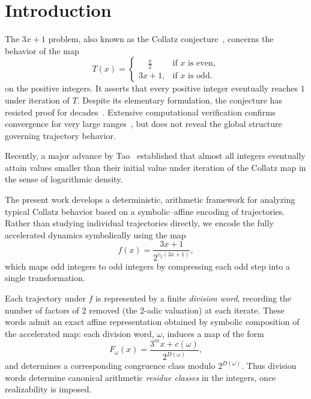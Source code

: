 \documentclass[12pt, oneside]{article}
\numberwithin{equation}{section}
\theoremstyle{definition}
\theoremstyle{plain}
\theoremstyle{remark}
\begin{document}
\newpage
\tableofcontents

\newpage
\section{Introduction}

The $3x+1$ problem, also known as the Collatz conjecture~\cite{Collatz1937}, concerns
the behavior of the map
\[
T(x) =
\begin{cases}
\displaystyle
    \phantom{3x} \frac{x}{2} & \text {if } x \text{ is even}, \\[8pt]
\displaystyle
    3x+1,                    & \text{if $x$ is odd}.
\end{cases}
\]
on the positive integers. It asserts that every positive integer eventually reaches $1$
under iteration of $T$. Despite its elementary formulation, the conjecture has resisted
proof for decades~\cite{Lagarias2010,Terras1976}. Extensive computational verification
confirms convergence for very large ranges~\cite{OliveiraESilva2010}, but does not
reveal the global structure governing trajectory behavior.

Recently, a major advance by Tao~\cite{Tao2019} established that almost all integers
eventually attain values smaller than their initial value under iteration of the Collatz
map in the sense of logarithmic density.

The present work develops a deterministic, arithmetic framework for analyzing typical
Collatz behavior based on a symbolic--affine encoding of trajectories. Rather than
studying individual trajectories directly, we encode the fully accelerated dynamics
symbolically using the map
\[
f(x)=\frac{3x+1}{2^{v_2(3x+1)}},
\]
which maps odd integers to odd integers by compressing each odd step into a single
transformation.

Each trajectory under $f$ is represented by a finite \emph{division word}, recording the
number of factors of $2$ removed (the 2-adic valuation) at each iterate. These words admit
an exact affine representation obtained by symbolic composition of the accelerated map:
each division word, \(\omega\), induces a map of the form
\[
F_\omega(x) = \frac{3^m x + c(\omega)}{2^{D(\omega)}},
\]
and determines a corresponding congruence class modulo $2^{D(\omega)}$. Thus division words
determine canonical arithmetic \emph{residue classes} in the integers, once realizability
is imposed.
\end{document}
